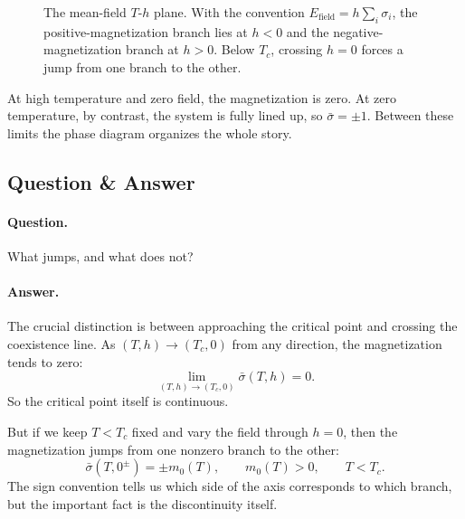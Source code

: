 \begin{figure}[t]
\centering
{}
\caption{The mean-field \(T\)-\(h\) plane. With the convention \(E_{\text{field}}=h\sum_i\sigma_i\), the positive-magnetization branch lies at \(h<0\) and the negative-magnetization branch at \(h>0\). Below \(T_c\), crossing \(h=0\) forces a jump from one branch to the other.}
\end{figure}

At high temperature and zero field, the magnetization is zero. At zero temperature, by contrast, the system is fully lined up, so \(\bar{\sigma}=\pm1\). Between these limits the phase diagram organizes the whole story.

\subsection{Question \& Answer}

\paragraph{Question.} What jumps, and what does not?

\paragraph{Answer.} The crucial distinction is between approaching the critical point and crossing the coexistence line. As \((T,h)\to(T_c,0)\) from any direction, the magnetization tends to zero:
\begin{equation}
\lim_{(T,h)\to(T_c,0)} \bar{\sigma}(T,h)=0.
\end{equation}
So the critical point itself is continuous.

But if we keep \(T<T_c\) fixed and vary the field through \(h=0\), then the magnetization jumps from one nonzero branch to the other:
\begin{equation}
\bar{\sigma}(T,0^\pm)=\pm m_0(T),
\qquad
m_0(T)>0,
\qquad
T<T_c.
\end{equation}
The sign convention tells us which side of the axis corresponds to which branch, but the important fact is the discontinuity itself.

